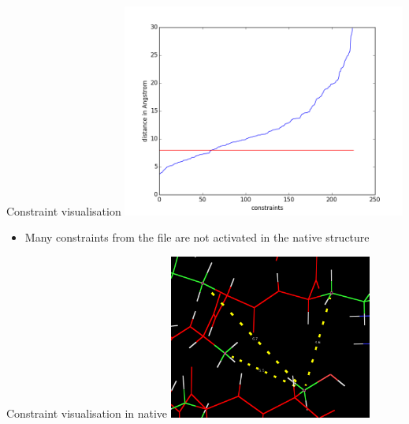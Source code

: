 \documentclass{beamer}
\begin{document}
\begin{frame}{Constraint visualisation}
    \centering
    \includegraphics[width=0.7\textwidth]{img/constraintGroundTruth}
    \begin{itemize}
    \item Many constraints from the file are not activated in the native structure
    \end{itemize}
\end{frame}


\begin{frame}{Constraint visualisation in native}
    \centering
    \includegraphics[width=0.5\textwidth]{img/constraints}
\end{frame}
\end{document}
